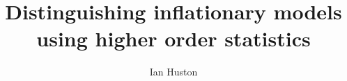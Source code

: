 \renewcommand{\CVSrevision}{\version$Id: title.tex,v 1.2 2009/07/12 17:47:59 ith Exp $}
% 
% 
% 
% 
% 
% 
% 
% 
\title{Distinguishing inflationary models using higher order statistics}
% 
% 
\author{Ian Huston}
% 
% 
\maketitle